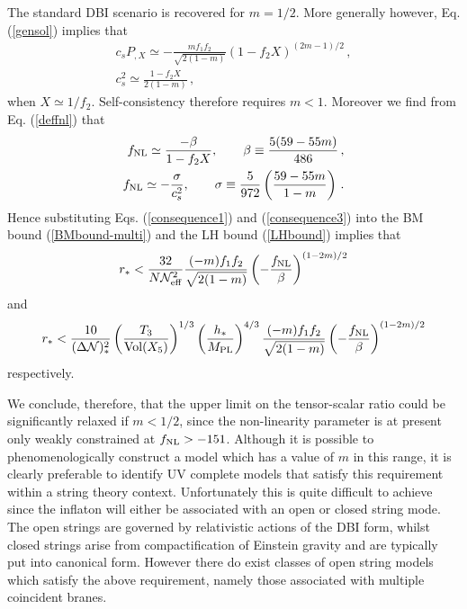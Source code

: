 The standard DBI scenario is recovered for $m=1/2$. 
More generally however, Eq. (\ref{gensol}) implies that  
\begin{eqnarray}
\label{consequence1}
c_sP_{,X} \simeq -\frac{m f_1 f_2}{\sqrt{2(1-m)}} \left( 
1- f_2X \right)^{(2m-1)/2} \,,
\\
c_s^2 \simeq \frac{1-f_2X}{2(1-m)} \,,
\end{eqnarray}
when $X \simeq 1/f_2$. Self-consistency therefore
requires $m<1$. Moreover
we find from Eq. (\ref{deffnl}) that 
\begin{eqnarray}
\label{consequence3}
f_{\mathrm{NL}} \simeq \frac{-\beta}{1-f_2X} , \qquad \beta \equiv \frac{5(59-55m)}{486}
\,,
\\
\label{consequence4}
f_{\mathrm{NL}} \simeq -\frac{\sigma}{c_s^2}, \qquad \sigma \equiv 
\frac{5}{972} \left( \frac{59-55m}{1-m} \right) \,.
\end{eqnarray}
Hence substituting Eqs. (\ref{consequence1}) and (\ref{consequence3}) 
into the BM bound (\ref{BMbound-multi}) and the LH bound (\ref{LHbound}) implies that 
\begin{equation}
\label{weakBMbound-multi}
r_*< \frac{32}{N {\cal{N}}_{\rm eff}^2} \frac{(-m) f_1 f_2}{\sqrt{2(1-m)}}
\left( -\frac{f_{\mathrm{NL}}}{\beta} \right)^{(1-2m)/2}
\end{equation}
and 
\begin{equation}
\label{weakLHbound}
r_* < \frac{10}{(\Delta {\cal{N}})_*^2} \left( \frac{T_3}{\mathrm{Vol} (X_5)} \right)^{1/3} 
\left( \frac{h_*}{M_{\mathrm{PL}}} \right)^{4/3}
\frac{(-m) f_1 f_2}{\sqrt{2(1-m)}}
\left( -\frac{f_{\mathrm{NL}}}{\beta} \right)^{(1-2m)/2}
\end{equation}
respectively. 

We conclude, therefore, that 
the upper limit on the tensor-scalar ratio could be significantly 
relaxed if $m <1/2$, since the non-linearity parameter is at present only 
weakly constrained at $f_{\mathrm{NL}} >-151$. Although it is possible 
to phenomenologically construct a model which has a value of $m$ in this 
range, it is clearly preferable to identify  UV complete models
that satisfy this requirement within a string theory context. 
Unfortunately this is quite difficult to achieve since the inflaton 
will either be associated with an open or closed string mode. 
The open strings are governed by relativistic actions of the 
DBI form, whilst closed strings arise from compactification of Einstein gravity
and are typically put into canonical form.
However there do exist classes of open string
models which satisfy the above requirement, 
namely those associated with multiple coincident branes.

